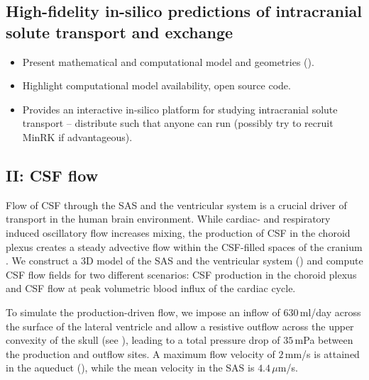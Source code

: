 \documentclass[fleqn,10pt]{wlscirep}
\newcommand{\draft}[1]{\textcolor{gray}{#1}}
\begin{document}
\subsection*{High-fidelity in-silico predictions of intracranial solute transport and exchange}

\begin{itemize}
\item
  Present mathematical and computational model and geometries (). 
\item
  Highlight computational model availability, open source code.
\item
  Provides an interactive in-silico platform for studying intracranial solute transport -- distribute such that anyone can run (possibly try to recruit MinRK if advantageous).
\end{itemize}

\draft{\lipsum[1]}

\subsection*{II: CSF flow}

Flow of CSF through the SAS and the ventricular system is a crucial driver of transport in the human brain environment. While cardiac- and respiratory induced oscillatory flow increases mixing, the production of CSF in the choroid plexus creates a steady advective flow within the CSF-filled spaces of the cranium \cite{hornkjol2022csf}. 
We construct a 3D model of the SAS and the ventricular system () and compute CSF flow fields for two different scenarios: CSF production in the choroid plexus and CSF flow at peak volumetric blood influx of the cardiac cycle.

To simulate the production-driven flow, we impose an inflow of $630\,$ml/day \cite{nilsson1992circadian} across the surface of the lateral ventricle and allow a resistive outflow across the upper convexity of the skull (see ), leading to a total pressure drop of $35\,$mPa between the production and outflow sites. A maximum flow velocity of $2\,$mm/s is attained in the aqueduct (), while the mean velocity in the SAS is $4.4\,\mu$m/s.
\end{document}
